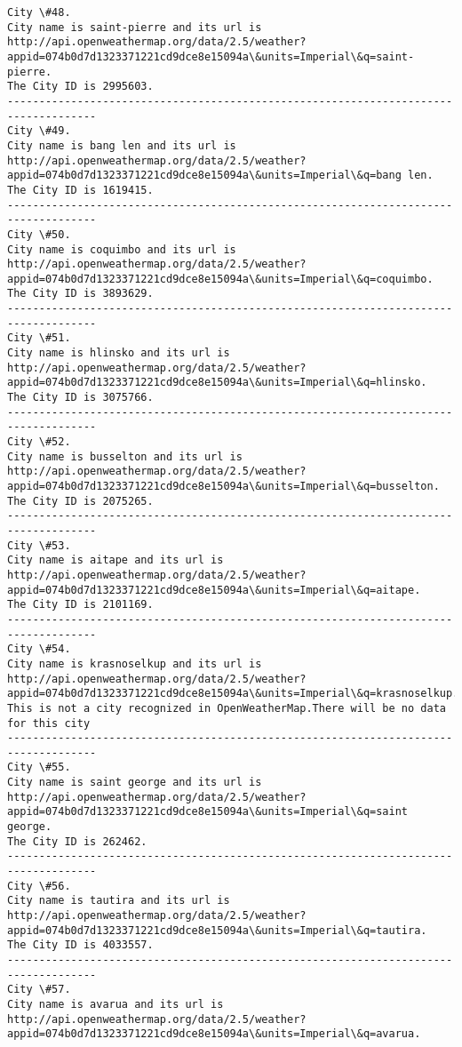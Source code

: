 \documentclass[11pt]{article}
\begin{document}
\begin{Verbatim}[commandchars=\\\{\}]
City \#48.
City name is saint-pierre and its url is http://api.openweathermap.org/data/2.5/weather?appid=074b0d7d1323371221cd9dce8e15094a\&units=Imperial\&q=saint-pierre.
The City ID is 2995603.
------------------------------------------------------------------------------------
City \#49.
City name is bang len and its url is http://api.openweathermap.org/data/2.5/weather?appid=074b0d7d1323371221cd9dce8e15094a\&units=Imperial\&q=bang len.
The City ID is 1619415.
------------------------------------------------------------------------------------
City \#50.
City name is coquimbo and its url is http://api.openweathermap.org/data/2.5/weather?appid=074b0d7d1323371221cd9dce8e15094a\&units=Imperial\&q=coquimbo.
The City ID is 3893629.
------------------------------------------------------------------------------------
City \#51.
City name is hlinsko and its url is http://api.openweathermap.org/data/2.5/weather?appid=074b0d7d1323371221cd9dce8e15094a\&units=Imperial\&q=hlinsko.
The City ID is 3075766.
------------------------------------------------------------------------------------
City \#52.
City name is busselton and its url is http://api.openweathermap.org/data/2.5/weather?appid=074b0d7d1323371221cd9dce8e15094a\&units=Imperial\&q=busselton.
The City ID is 2075265.
------------------------------------------------------------------------------------
City \#53.
City name is aitape and its url is http://api.openweathermap.org/data/2.5/weather?appid=074b0d7d1323371221cd9dce8e15094a\&units=Imperial\&q=aitape.
The City ID is 2101169.
------------------------------------------------------------------------------------
City \#54.
City name is krasnoselkup and its url is http://api.openweathermap.org/data/2.5/weather?appid=074b0d7d1323371221cd9dce8e15094a\&units=Imperial\&q=krasnoselkup.
This is not a city recognized in OpenWeatherMap.There will be no data for this city
------------------------------------------------------------------------------------
City \#55.
City name is saint george and its url is http://api.openweathermap.org/data/2.5/weather?appid=074b0d7d1323371221cd9dce8e15094a\&units=Imperial\&q=saint george.
The City ID is 262462.
------------------------------------------------------------------------------------
City \#56.
City name is tautira and its url is http://api.openweathermap.org/data/2.5/weather?appid=074b0d7d1323371221cd9dce8e15094a\&units=Imperial\&q=tautira.
The City ID is 4033557.
------------------------------------------------------------------------------------
City \#57.
City name is avarua and its url is http://api.openweathermap.org/data/2.5/weather?appid=074b0d7d1323371221cd9dce8e15094a\&units=Imperial\&q=avarua.

\end{Verbatim}
\end{document}
